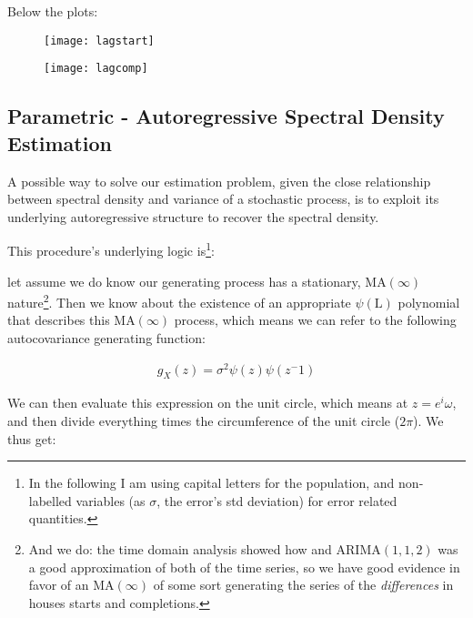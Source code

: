 \documentclass[12pt]{article} %
\begin{document}
Below the plots:

\begin{figure}[H]
\begin{center}
\texttt{[image: lagstart]}
\caption{}
\end{center}
\end{figure}

\begin{figure}[H]
\begin{center}
\texttt{[image: lagcomp]}
\caption{}
\end{center}
\end{figure}


\subsection{Parametric - Autoregressive Spectral Density Estimation}

A possible way to solve our estimation problem, given the close relationship between spectral density and variance of a stochastic process, is to exploit its underlying autoregressive structure to recover the spectral density. 

This procedure's underlying logic is\footnote{In the following I am using capital letters for the population, and non-labelled variables (as $\sigma$, the error's std deviation) for error related quantities.}: 

let assume we do know our generating process has a stationary, $\text{MA}(\infty)$ nature\footnote{
And we do: the time domain analysis showed how and $\text{ARIMA}(1,1,2)$ was a good approximation of both of the time series, so we have good evidence in favor of an $\text{MA}(\infty)$ of some sort generating the series of the {\em differences} in houses starts and completions.}. Then we know about the existence of an appropriate $\psi(\text{L})$ polynomial that describes this $\text{MA}(\infty)$ process, which means we can refer to the following autocovariance generating function:

\begin{equation}
\begin{aligned}
g_X(z)=\sigma^2\psi(z)\psi(z^-1)
\end{aligned}
\end{equation}

We can then evaluate this expression on the unit circle, which means at $z=e^i\omega$, and then divide everything times the circumference of the unit circle ($2\pi$). We thus get:
\end{document}
